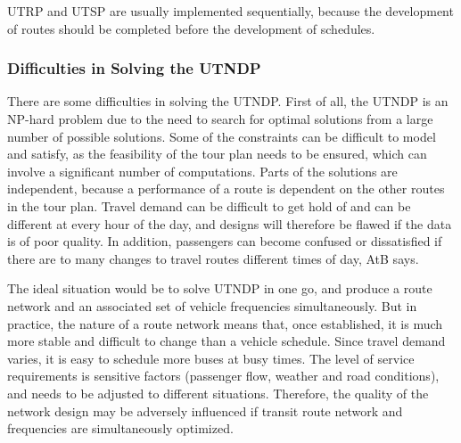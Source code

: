 UTRP and UTSP are usually implemented sequentially, because the development of routes should be completed before the development of schedules. 

\subsubsection{Difficulties in Solving the UTNDP}
There are some difficulties in solving the UTNDP. First of all, the UTNDP is an NP-hard problem due to the need to search for optimal solutions from a large number of possible solutions. Some of the constraints can be difficult to model and satisfy, as the feasibility of the tour plan needs to be ensured, which can involve a significant number of computations. Parts of the solutions are independent, because a performance of a route is dependent on the other routes in the tour plan. Travel demand can be difficult to get hold of and can be different at every hour of the day, and designs will therefore be flawed if the data is of poor quality. In addition, passengers can become confused or dissatisfied if there are to many changes to travel routes different times of day, AtB says. 

The ideal situation would be to solve UTNDP in one go, and produce a route network and an associated set of vehicle frequencies simultaneously. But in practice, the nature of a route network means that, once established, it is much more stable and difficult to change than a vehicle schedule. Since travel demand varies, it is easy to schedule more buses at busy times. The level of service requirements is sensitive factors (passenger flow, weather and road conditions), and needs to be adjusted to different situations. Therefore, the quality of the network design may be adversely influenced if transit route network and frequencies are simultaneously optimized. 





